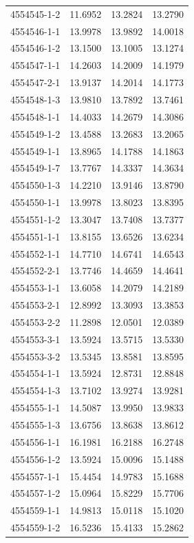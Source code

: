 \begin{longtable}{lrrr}
4554545-1-2 & 11.6952 & 13.2824 & 13.2790 \\
4554546-1-1 & 13.9978 & 13.9892 & 14.0018 \\
4554546-1-2 & 13.1500 & 13.1005 & 13.1274 \\
4554547-1-1 & 14.2603 & 14.2009 & 14.1979 \\
4554547-2-1 & 13.9137 & 14.2014 & 14.1773 \\
4554548-1-3 & 13.9810 & 13.7892 & 13.7461 \\
4554548-1-1 & 14.4033 & 14.2679 & 14.3086 \\
4554549-1-2 & 13.4588 & 13.2683 & 13.2065 \\
4554549-1-1 & 13.8965 & 14.1788 & 14.1863 \\
4554549-1-7 & 13.7767 & 14.3337 & 14.3634 \\
4554550-1-3 & 14.2210 & 13.9146 & 13.8790 \\
4554550-1-1 & 13.9978 & 13.8023 & 13.8395 \\
4554551-1-2 & 13.3047 & 13.7408 & 13.7377 \\
4554551-1-1 & 13.8155 & 13.6526 & 13.6234 \\
4554552-1-1 & 14.7710 & 14.6741 & 14.6543 \\
4554552-2-1 & 13.7746 & 14.4659 & 14.4641 \\
4554553-1-1 & 13.6058 & 14.2079 & 14.2189 \\
4554553-2-1 & 12.8992 & 13.3093 & 13.3853 \\
4554553-2-2 & 11.2898 & 12.0501 & 12.0389 \\
4554553-3-1 & 13.5924 & 13.5715 & 13.5330 \\
4554553-3-2 & 13.5345 & 13.8581 & 13.8595 \\
4554554-1-1 & 13.5924 & 12.8731 & 12.8848 \\
4554554-1-3 & 13.7102 & 13.9274 & 13.9281 \\
4554555-1-1 & 14.5087 & 13.9950 & 13.9833 \\
4554555-1-3 & 13.6756 & 13.8638 & 13.8612 \\
4554556-1-1 & 16.1981 & 16.2188 & 16.2748 \\
4554556-1-2 & 13.5924 & 15.0096 & 15.1488 \\
4554557-1-1 & 15.4454 & 14.9783 & 15.1688 \\
4554557-1-2 & 15.0964 & 15.8229 & 15.7706 \\
4554559-1-1 & 14.9813 & 15.0118 & 15.1020 \\
4554559-1-2 & 16.5236 & 15.4133 & 15.2862 \\

\end{longtable}
